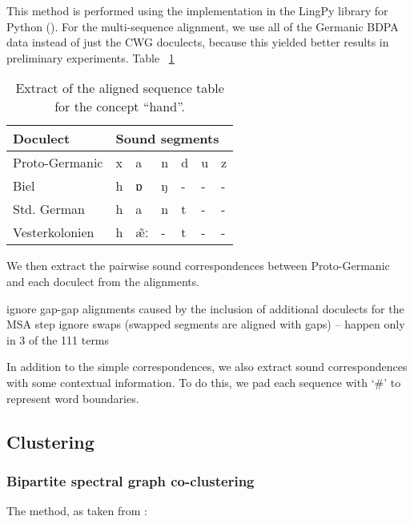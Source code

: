 \documentclass{article}
\begin{document}
This method is performed using the implementation in the LingPy library for Python (\cite{list2018lingpy}).
For the multi-sequence alignment, we use all of the Germanic BDPA data instead of just the CWG doculects, because this yielded better results in preliminary experiments. %
Table ~\ref{tab:msa}

\begin{table}[]
\begin{center}
\begin{tabular}{l|llllll}
Doculect       & \multicolumn{6}{l}{Sound segments} \\ \hline
Proto-Germanic & x   & a     & n   & d   & u   & z  \\
Biel           & h   & ɒ     & ŋ   & -   & -   & -  \\
Std. German    & h   & a     & n   & t   & -   & -  \\
Vesterkolonien & h   & æ̃ː    & -   & t   & -   & - 
\end{tabular}
\end{center}
\label{tab:msa}
\caption{Extract of the aligned sequence table for the concept ``hand''.}
\end{table}

We then extract the pairwise sound correspondences between Proto-Germanic and each doculect from the alignments.

ignore gap-gap alignments caused by the inclusion of additional doculects for the MSA step
ignore swaps (swapped segments are aligned with gaps) -- happen only in 3 of the 111 terms

In addition to the simple correspondences, we also extract sound correspondences with some contextual information.
To do this, we pad each sequence with `#' to represent word boundaries.


\subsection{Clustering}

\subsubsection{Bipartite spectral graph co-clustering}

The method, as taken from \cite{dhillon2001co-clustering}:
\end{document}

